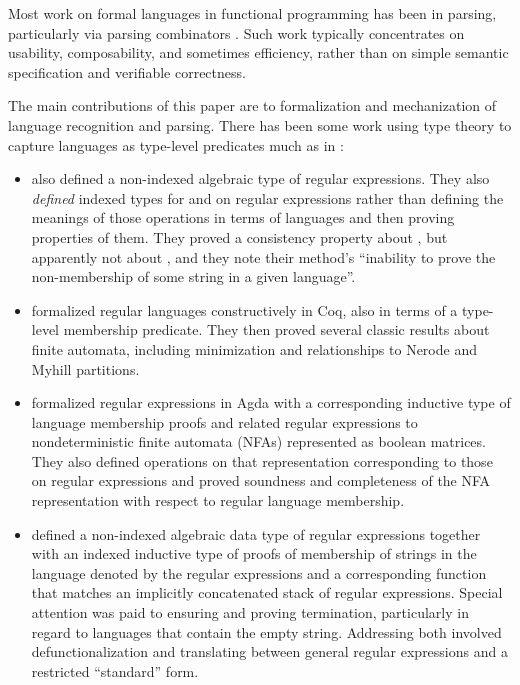 \documentclass[acmsmall,screen,timestamp]{acmart}  %
\begin{document}
Most work on formal languages in functional programming has been in parsing, particularly via parsing combinators \citep{Hutton1996monadic, Leijen2001parsec, Swierstra2008combinator}.
Such work typically concentrates on usability, composability, and sometimes efficiency, rather than on simple semantic specification and verifiable correctness.

The main contributions of this paper are to formalization and mechanization of language recognition and parsing.
There has been some work using type theory to capture languages as type-level predicates much as in :
\begin{itemize}

\item \citet{AgularMannaa2009} also defined a non-indexed algebraic type of regular expressions.
They also \emph{defined} indexed types for  and  on regular expressions rather than defining the meanings of those operations in terms of languages and then proving properties of them.
They proved a consistency property about , but apparently not about , and they note their method's ``inability to prove the non-membership of some string in a given language''.

\item \citet{DoczkalEtAl2013} formalized regular languages constructively in Coq, also in terms of a type-level membership predicate.
They then proved several classic results about finite automata, including minimization and relationships to Nerode and Myhill partitions.

\item \citet{FirsovUustalu2013} formalized regular expressions in Agda with a corresponding inductive type of language membership proofs and related regular expressions to nondeterministic finite automata (NFAs) represented as boolean matrices.
They also defined operations on that representation corresponding to those on regular expressions and proved soundness and completeness of the NFA representation with respect to regular language membership.

\item \citet{KorkutEtAl2016} defined a non-indexed algebraic data type of regular expressions together with an indexed inductive type of proofs of membership of strings in the language denoted by the regular expressions and a corresponding function that matches an implicitly concatenated stack of regular expressions.
Special attention was paid to ensuring and proving termination, particularly in regard to languages that contain the empty string.
Addressing both involved defunctionalization and translating between general regular expressions and a restricted ``standard'' form.


\end{itemize}
\end{document}

